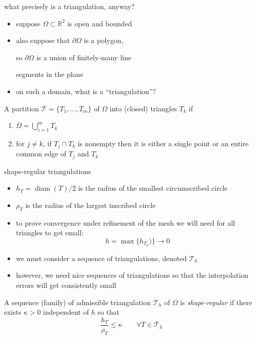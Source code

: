 \documentclass[10pt,
               svgnames,
               hyperref={colorlinks,
                         citecolor=DeepPink4,
                         linkcolor=FireBrick,
                         urlcolor=blue},
               usepdftitle=false]{beamer}
\newcommand{\RR}{\mathbb{R}}
\begin{document}
\begin{frame}{what precisely is a triangulation, anyway?}

\begin{itemize}
\item suppose $\Omega\subset \RR^2$ is open and bounded
\item also suppose that $\partial \Omega$ is a \alert{polygon},

so $\partial \Omega$ is a union of finitely-many line

segments in the plane
\item on such a domain, what is a ``triangulation''?
\end{itemize}

\vspace{-20mm}
\hfill 

\begin{definition}
A partition $\mathcal{T}=\{T_1,\dots,T_m\}$ of $\Omega$ into (closed) triangles $T_k$ if
\begin{enumerate}
\item $\overline\Omega = \bigcup_{i=1}^m T_k$
\item for $j\ne k$, if $T_j\cap T_k$ is nonempty then it is either a single point or an entire common edge of $T_j$ and $T_k$
\end{enumerate}
\end{definition}
\end{frame}


\begin{frame}{shape-regular triangulations}

\begin{itemize}
\item $h_T=\operatorname{diam}(T)/2$ is the radius of the smallest circumscribed circle
\item $\rho_T$ is the radius of the largest inscribed circle
\item to prove convergence under refinement of the mesh we will need for all triangles to get small:
	$$h = \max \{h_{T_k})\} \to 0$$
\item we must consider a \alert{sequence of triangulations}, denoted $\mathcal{T}_h$
\item however, we need \alert{nice} sequences of triangulations so that the interpolation errors will get consistently small
\end{itemize}

\begin{definition}
A sequence (family) of admissible triangulation $\mathcal{T}_h$ of $\Omega$ is \alert{\emph{shape-regular}} if there \alert{exists $\kappa>0$ independent of $h$} so that
	$$\frac{h_T}{\rho_T} \le \kappa \qquad \forall T\in \mathcal{T}_h$$
\end{definition}
\end{frame}
\end{document}
